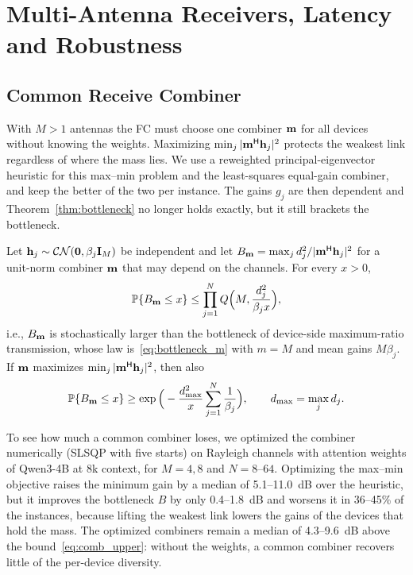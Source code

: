 \section{Multi-Antenna Receivers, Latency and Robustness}
\label{sec:regime}

\subsection{Common Receive Combiner}

With $M>1$ antennas the FC must choose one combiner $\mathbf{m}$ for all devices without knowing the weights. Maximizing $\min_j|\mathbf{m}^{\mathsf H}\mathbf{h}_j|^2$ protects the weakest link regardless of where the mass lies. We use a reweighted principal-eigenvector heuristic for this max--min problem and the least-squares equal-gain combiner, and keep the better of the two per instance. The gains $g_j$ are then dependent and Theorem~\ref{thm:bottleneck} no longer holds exactly, but it still brackets the bottleneck.

\begin{proposition}\label{prop:combiner}
Let $\mathbf{h}_j\sim\mathcal{CN}(\mathbf{0},\beta_j\mathbf{I}_M)$ be independent and let $B_{\mathbf{m}}=\max_jd_j^2/|\mathbf{m}^{\mathsf H}\mathbf{h}_j|^2$ for a unit-norm combiner $\mathbf{m}$ that may depend on the channels. For every $x>0$,
\begin{equation}
\mathbb{P}\{B_{\mathbf{m}}\le x\}\le\prod_{j=1}^NQ\Big(M,\frac{d_j^2}{\beta_jx}\Big),
\label{eq:comb_upper}
\end{equation}
i.e., $B_{\mathbf{m}}$ is stochastically larger than the bottleneck of device-side maximum-ratio transmission, whose law is~\eqref{eq:bottleneck_m} with $m=M$ and mean gains $M\beta_j$. If $\mathbf{m}$ maximizes $\min_j|\mathbf{m}^{\mathsf H}\mathbf{h}_j|^2$, then also
\begin{equation}
\mathbb{P}\{B_{\mathbf{m}}\le x\}\ge\exp\Big(-\frac{d_{\max}^2}{x}\sum_{j=1}^N\frac{1}{\beta_j}\Big),\qquad d_{\max}=\max_jd_j.
\label{eq:comb_lower}
\end{equation}
\end{proposition}

To see how much a common combiner loses, we optimized the combiner numerically (SLSQP with five starts) on Rayleigh channels with attention weights of Qwen3-4B at 8k context, for $M=4,8$ and $N=8$--$64$. Optimizing the max--min objective raises the minimum gain by a median of 5.1--11.0~dB over the heuristic, but it improves the bottleneck $B$ by only 0.4--1.8~dB and worsens it in 36--45\% of the instances, because lifting the weakest link lowers the gains of the devices that hold the mass. The optimized combiners remain a median of 4.3--9.6~dB above the bound~\eqref{eq:comb_upper}: without the weights, a common combiner recovers little of the per-device diversity.

